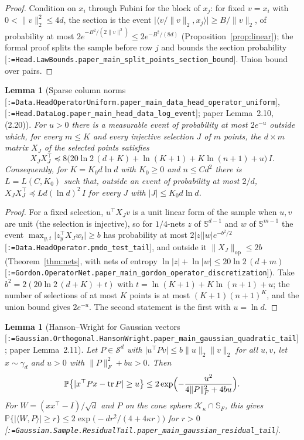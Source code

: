 \documentclass[11pt]{article}
\makeatletter
\newcommand{\formal@break}[1]{\@tfor\formal@tok:=#1\do{%
  \formal@tok
  \expandafter\ifx\formal@tok.\allowbreak\else
  \expandafter\ifx\formal@tok\_\allowbreak\fi\fi}}
\DeclareRobustCommand{\formal}[1]{\textnormal{[\texttt{\small\formal@break{#1}}]}}
\newcommand{\Prob}{\mathbb{P}}
\newcommand{\Sym}{\mathcal{S}}
\newcommand{\ip}[2]{\langle #1, #2\rangle}
\newcommand{\norm}[1]{\lVert #1\rVert}
\newcommand{\abs}[1]{\lvert #1\rvert}
\newcommand{\tr}{\operatorname{tr}}
\newcommand{\op}{\mathrm{op}}
\newcommand{\Fro}{F}
\newcommand{\sqd}{\sqrt{d}}
\newcommand{\Id}{I}
\newcommand{\cone}{\mathcal{K}}
\newcommand{\gauss}{\gamma}
\theoremstyle{plain}
\newtheorem{lemma}[theorem]{Lemma}
\theoremstyle{definition}
\makeatother
\begin{document}
\begin{proof}
Condition on $x_i$ through Fubini for the block of $x_j$: for fixed
$v = x_i$ with $0 < \norm{v}_2^2 \le 4d$, the section is the event
$\abs{\ip{v/\norm{v}_2}{x_j}} \ge B/\norm{v}_2$, of probability at most
$2e^{-B^2/(2\norm{v}^2)} \le 2e^{-B^2/(8d)}$ (Proposition~\ref{prop:linear});
the formal proof splits the sample before row $j$ and bounds the section
probability \formal{Head.LawBounds.paper\_main\_split\_points\_section\_bound}.
Union bound over pairs.
\end{proof}

\begin{lemma}[Sparse column norms \formal{Data.HeadOperatorUniform.paper\_main\_data\_head\_operator\_uniform}, \formal{Head.DataLog.paper\_main\_head\_data\_log\_event}; paper Lemma~2.10, (2.20)]\label{lem:sparse}
For $u > 0$ there is a measurable event of probability at most $2e^{-u}$
outside which, for every $m \le K$ and every injective selection
$J$ of $m$ points, the $d\times m$ matrix $X_J$ of the selected points satisfies
\[
X_J X_J^{\top} \preceq 8\bigl(20\ln 2\,(d + K) + \ln(K+1) + K\ln(n+1) + u\bigr)\,\Id .
\]
Consequently, for $K = K_0 d\ln d$ with $K_0 \ge 0$ and $n \le Cd^2$ there is
$L = L(C, K_0)$ such that, outside an event of probability at most $2/d$,
$X_J X_J^{\top} \preceq L d(\ln d)^2\,\Id$ for every $J$ with $\abs{J} \le K_0 d\ln d$.
\end{lemma}

\begin{proof}
For a fixed selection, $u^{\top}X_J v$ is a unit linear form of the sample
when $u, v$ are unit (the selection is injective), so for $1/4$-nets $z$ of
$\mathbb{S}^{d-1}$ and $w$ of $\mathbb{S}^{m-1}$ the event
$\max_{y,t}\abs{z_y^{\top}X_Jw_t} \ge b$ has probability at most
$2\abs{z}\abs{w}e^{-b^2/2}$ \formal{Data.HeadOperator.pmdo\_test\_tail},
and outside it $\norm{X_J}_\op \le 2b$ (Theorem~\ref{thm:nets}, with nets
of entropy $\ln\abs{z} + \ln\abs{w} \le 20\ln2\,(d + m)$
\formal{Gordon.OperatorNet.paper\_main\_gordon\_operator\_discretization}).
Take $b^2 = 2(20\ln 2\,(d + K) + t)$ with $t = \ln(K+1) + K\ln(n+1) + u$;
the number of selections of at most $K$ points is at most $(K+1)(n+1)^K$,
and the union bound gives $2e^{-u}$. The second statement is the first with
$u = \ln d$.
\end{proof}

\begin{lemma}[Hanson--Wright for Gaussian vectors \formal{Gaussian.Orthogonal.HansonWright.paper\_main\_gaussian\_quadratic\_tail}; paper Lemma~2.11]\label{lem:hw}
Let $P \in \Sym^d$ with $\abs{u^{\top}Pv} \le b\norm{u}_2\norm{v}_2$ for all
$u, v$, let $x \sim \gauss_d$ and $u > 0$ with $\norm{P}_\Fro^2 + bu > 0$. Then
\[
\Prob\bigl\{\abs{x^{\top}Px - \tr P} \ge u\bigr\} \le 2\exp\Bigl(-\frac{u^2}{4\norm{P}_\Fro^2 + 4bu}\Bigr).
\]
For $W = (xx^{\top} - \Id)/\sqd$ and $P$ on the cone sphere $\cone_\kappa\cap\mathbb{S}_\Fro$, this gives
$\Prob\{\abs{\ip{W}{P}} \ge r\} \le 2\exp\bigl(-dr^2/(4 + 4\kappa r)\bigr)$ for $r > 0$
\formal{Gaussian.Sample.ResidualTail.paper\_main\_gaussian\_residual\_tail}.
\end{lemma}
\end{document}
